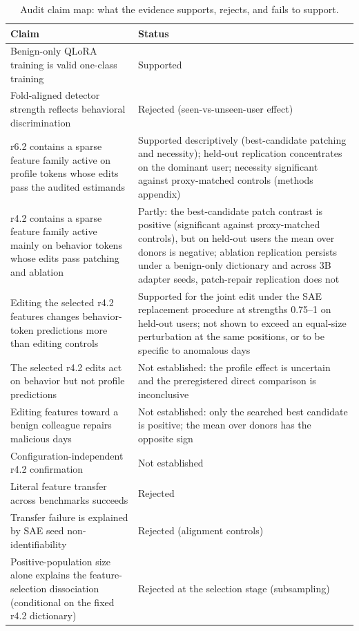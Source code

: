\begin{table}[htbp]
\caption{Audit claim map: what the evidence supports, rejects, and fails to support.}
\label{tab:claim_status}
\centering
\small
\begin{tabular}{p{7.6cm}p{5.6cm}}
\toprule
Claim & Status \\
\midrule
Benign-only QLoRA training is valid one-class training & Supported \\
Fold-aligned detector strength reflects behavioral discrimination & Rejected (seen-vs-unseen-user effect) \\
r6.2 contains a sparse feature family active on profile tokens whose edits pass the audited estimands & Supported descriptively (best-candidate patching and necessity); held-out replication concentrates on the dominant user; necessity significant against proxy-matched controls (methods appendix) \\
r4.2 contains a sparse feature family active mainly on behavior tokens whose edits pass patching and ablation & Partly: the best-candidate patch contrast is positive (significant against proxy-matched controls), but on held-out users the mean over donors is negative; ablation replication persists under a benign-only dictionary and across 3B adapter seeds, patch-repair replication does not \\
Editing the selected r4.2 features changes behavior-token predictions more than editing controls & Supported for the joint edit under the SAE replacement procedure at strengths 0.75--1 on held-out users; not shown to exceed an equal-size perturbation at the same positions, or to be specific to anomalous days \\
The selected r4.2 edits act on behavior but not profile predictions & Not established: the profile effect is uncertain and the preregistered direct comparison is inconclusive \\
Editing features toward a benign colleague repairs malicious days & Not established: only the searched best candidate is positive; the mean over donors has the opposite sign \\
Configuration-independent r4.2 confirmation & Not established \\
Literal feature transfer across benchmarks succeeds & Rejected \\
Transfer failure is explained by SAE seed non-identifiability & Rejected (alignment controls) \\
Positive-population size alone explains the feature-selection dissociation (conditional on the fixed r4.2 dictionary) & Rejected at the selection stage (subsampling) \\

\end{tabular}
\end{table}
